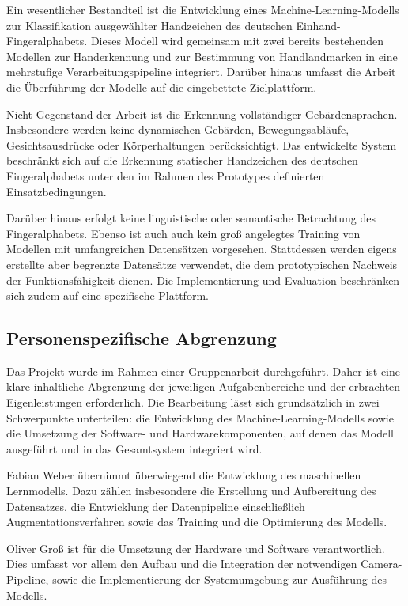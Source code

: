 Ein wesentlicher Bestandteil ist die Entwicklung eines Machine-Learning-Modells zur Klassifikation ausgewählter Handzeichen des deutschen Einhand-Fingeralphabets. Dieses Modell wird gemeinsam mit zwei bereits bestehenden Modellen zur Handerkennung und zur Bestimmung von Handlandmarken in eine mehrstufige Verarbeitungspipeline integriert. Darüber hinaus umfasst die Arbeit die Überführung der Modelle auf die eingebettete Zielplattform.

Nicht Gegenstand der Arbeit ist die Erkennung vollständiger Gebärdensprachen. Insbesondere werden keine dynamischen Gebärden, Bewegungsabläufe, Gesichtsausdrücke oder Körperhaltungen berücksichtigt. Das entwickelte System beschränkt sich auf die Erkennung statischer Handzeichen des deutschen Fingeralphabets unter den im Rahmen des Prototypes definierten Einsatzbedingungen.

Darüber hinaus erfolgt keine linguistische oder semantische Betrachtung des Fingeralphabets. Ebenso ist auch auch kein groß angelegtes Training von Modellen mit umfangreichen Datensätzen vorgesehen. Stattdessen werden eigens erstellte aber begrenzte Datensätze verwendet, die dem prototypischen Nachweis der Funktionsfähigkeit dienen. Die Implementierung und Evaluation beschränken sich zudem auf eine spezifische Plattform.

\subsection{Personenspezifische Abgrenzung}

Das Projekt wurde im Rahmen einer Gruppenarbeit durchgeführt. Daher ist eine klare inhaltliche Abgrenzung der jeweiligen Aufgabenbereiche und der erbrachten Eigenleistungen erforderlich. Die Bearbeitung lässt sich grundsätzlich in zwei Schwerpunkte unterteilen: die Entwicklung des Machine-Learning-Modells sowie die Umsetzung der Software- und Hardwarekomponenten, auf denen das Modell ausgeführt und in das Gesamtsystem integriert wird.

Fabian Weber übernimmt überwiegend die Entwicklung des maschinellen Lernmodells. Dazu zählen insbesondere die Erstellung und Aufbereitung des Datensatzes, die Entwicklung der Datenpipeline einschließlich Augmentationsverfahren sowie das Training und die Optimierung des Modells.

Oliver Groß ist für die Umsetzung der Hardware und Software verantwortlich. Dies umfasst vor allem den Aufbau und die Integration der notwendigen Camera-Pipeline, sowie die Implementierung  der Systemumgebung zur Ausführung des Modells.

